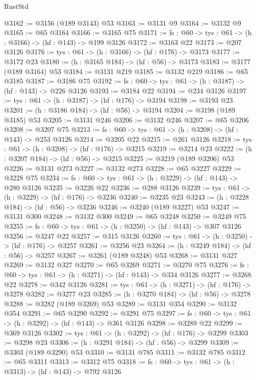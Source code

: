 \begin{lexlean}{RustStd}
\begin{coremodule}
@3162 := @3156 (@189 @3143) @53
@3163 := @3131 @9
@3164 := @3132 @9
@3165 := @65 @3164
@3166 := @3165 @75
@3171 := {fs : @60} -> {tys : @61} -> (h : @3166) -> (hf : @143) -> @199 @3126
@3172 := @3163 @22
@3173 := @207 @3126
@3176 := {tys : @61} -> (h : @3166) -> (hf : @176) -> @3173
@3177 := @3172 @23
@3180 := (h : @3165 @184) -> (hf : @56) -> @3173
@3183 := @3177 (@189 @3164) @53
@3184 := @3131 @219
@3185 := @3132 @219
@3186 := @65 @3185
@3187 := @3186 @75
@3192 := {fs : @60} -> {tys : @61} -> (h : @3187) -> (hf : @143) -> @226 @3126
@3193 := @3184 @22
@3194 := @234 @3126
@3197 := {tys : @61} -> (h : @3187) -> (hf : @176) -> @3194
@3198 := @3193 @23
@3201 := (h : @3186 @184) -> (hf : @56) -> @3194
@3204 := @3198 (@189 @3185) @53
@3205 := @3131 @246
@3206 := @3132 @246
@3207 := @65 @3206
@3208 := @3207 @75
@3213 := {fs : @60} -> {tys : @61} -> (h : @3208) -> (hf : @143) -> @253 @3126
@3214 := @3205 @22
@3215 := @261 @3126
@3218 := {tys : @61} -> (h : @3208) -> (hf : @176) -> @3215
@3219 := @3214 @23
@3222 := (h : @3207 @184) -> (hf : @56) -> @3215
@3225 := @3219 (@189 @3206) @53
@3226 := @3131 @273
@3227 := @3132 @273
@3228 := @65 @3227
@3229 := @3228 @75
@3234 := {fs : @60} -> {tys : @61} -> (h : @3229) -> (hf : @143) -> @280 @3126
@3235 := @3226 @22
@3236 := @288 @3126
@3239 := {tys : @61} -> (h : @3229) -> (hf : @176) -> @3236
@3240 := @3235 @23
@3243 := (h : @3228 @184) -> (hf : @56) -> @3236
@3246 := @3240 (@189 @3227) @53
@3247 := @3131 @300
@3248 := @3132 @300
@3249 := @65 @3248
@3250 := @3249 @75
@3255 := {fs : @60} -> {tys : @61} -> (h : @3250) -> (hf : @143) -> @307 @3126
@3256 := @3247 @22
@3257 := @315 @3126
@3260 := {tys : @61} -> (h : @3250) -> (hf : @176) -> @3257
@3261 := @3256 @23
@3264 := (h : @3249 @184) -> (hf : @56) -> @3257
@3267 := @3261 (@189 @3248) @53
@3268 := @3131 @327
@3269 := @3132 @327
@3270 := @65 @3269
@3271 := @3270 @75
@3276 := {fs : @60} -> {tys : @61} -> (h : @3271) -> (hf : @143) -> @334 @3126
@3277 := @3268 @22
@3278 := @342 @3126
@3281 := {tys : @61} -> (h : @3271) -> (hf : @176) -> @3278
@3282 := @3277 @23
@3285 := (h : @3270 @184) -> (hf : @56) -> @3278
@3288 := @3282 (@189 @3269) @53
@3289 := @3131 @354
@3290 := @3132 @354
@3291 := @65 @3290
@3292 := @3291 @75
@3297 := {fs : @60} -> {tys : @61} -> (h : @3292) -> (hf : @143) -> @361 @3126
@3298 := @3289 @22
@3299 := @369 @3126
@3302 := {tys : @61} -> (h : @3292) -> (hf : @176) -> @3299
@3303 := @3298 @23
@3306 := (h : @3291 @184) -> (hf : @56) -> @3299
@3309 := @3303 (@189 @3290) @53
@3310 := @3131 @785
@3311 := @3132 @785
@3312 := @65 @3311
@3313 := @3312 @75
@3318 := {fs : @60} -> {tys : @61} -> (h : @3313) -> (hf : @143) -> @792 @3126

\end{coremodule}
\end{lexlean}
